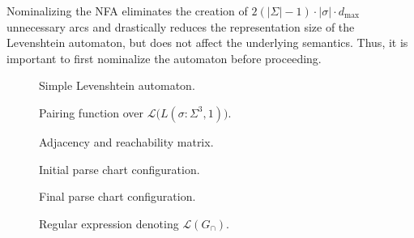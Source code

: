 \documentclass[sigplan,review,acmsmall,nonacm,screen,anonymous]{acmart}\settopmatter{printfolios=false,printccs=false,printacmref=false}
\begin{document}
Nominalizing the NFA eliminates the creation of $2(|\Sigma| - 1)\cdot|\sigma|\cdot d_\max$ unnecessary arcs and drastically reduces the representation size of the Levenshtein automaton, but does not affect the underlying semantics. Thus, it is important to first nominalize the automaton before proceeding.

\begin{figure}
\resizebox{0.4\textwidth}{!}{%

}
\caption{Simple Levenshtein automaton.}\label{fig:ex_atm}

\vspace{0.3cm}
\resizebox{0.4\textwidth}{!}{%

}
\caption{Pairing function over $\mathcal{L}\big(L(\sigma: \Sigma^3, 1)\big)$.}\label{fig:pairing_fun}

\vspace{0.3cm}
\begin{center}
\resizebox{0.35\textwidth}{!}{%

}
\end{center}
\vspace{-0.3cm}
\caption{Adjacency and reachability matrix.}\label{fig:reach_matr}

\vspace{0.3cm}
\resizebox{0.4\textwidth}{!}{

}
\caption{Initial parse chart configuration.}\label{fig:initial_pc}

\vspace{0.3cm}
\resizebox{0.4\textwidth}{!}{

}

\caption{Final parse chart configuration.}\label{fig:final_pc}

\begin{center}
\end{center}
\vspace{-0.3cm}
\caption{Regular expression denoting $\mathcal{L}(G_\cap)$.}\label{fig:re_tree}
\end{figure}
\end{document}
